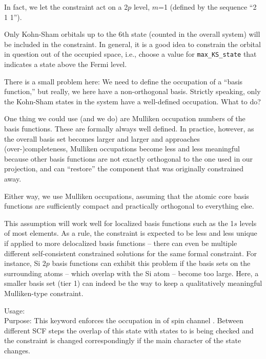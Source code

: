   In fact, we let the constraint act on a 2$p$ level, $m$=1 (defined
  by the sequence ``2 1 1'').

  Only Kohn-Sham orbitals up to the 6th state (counted in the overall
  system) will be included in the constraint. In general, it is a good
  idea to constrain the orbital in question out of the occupied space,
  i.e., choose a value for \texttt{max\_KS\_state} that indicates a
  state above the Fermi level.

  There is a small problem here: We need to define the occupation of a
  ``basis function,'' but   really, we here have a non-orthogonal
  basis. Strictly speaking, only the Kohn-Sham states    in the system
  have a well-defined occupation. What to do? 

  One thing we could use (and we do) are Mulliken occupation numbers
  of the basis functions. These are formally always well defined. In
  practice, however, as the overall basis set becomes larger and
  larger and approaches (over-)completeness, Mulliken occupations
  become less and less meaningful because other basis functions are
  not exactly orthogonal to the one used in our projection, and can
  ``restore'' the component that was originally constrained away. 

  Either way, we use Mulliken occupations, assuming that the atomic
  core basis functions are sufficiently compact and practically
  orthogonal to everything else.  

  This assumption will work well for localized basis functions
  such as the 1$s$ levels of most elements. As a rule, the constraint
  is expected to be less and less unique if applied to more
  delocalized basis functions -- there can even be multiple
  different self-consistent constrained solutions for the same formal
  constraint. For instance, Si 2$p$ basis functions can exhibit this
  problem if the basis sets on the surrounding atoms -- which overlap
  with the Si atom -- become too large. Here, a smaller basis set
  (tier 1) can indeed be the way to keep a qualitatively meaningful
  Mulliken-type constraint.


{
  \noindent
  Usage:       \\[1.0ex]
  Purpose: This keyword enforces the occupation  in 
     of spin channel . Between different SCF steps the overlap of this state 
     with states  to  is being checked and the 
     constraint is changed correspondingly if the main character of the state changes. \\
}

